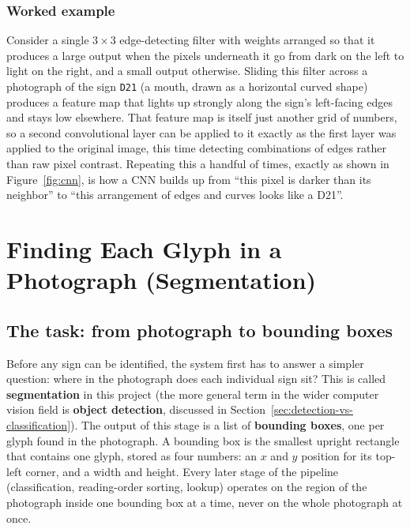 \documentclass[11pt,a4paper]{report}
\begin{document}
\subsection*{Worked example}

Consider a single $3\times3$ edge-detecting filter with weights arranged so
that it produces a large output when the pixels underneath it go from dark
on the left to light on the right, and a small output otherwise. Sliding
this filter across a photograph of the sign \texttt{D21} (a mouth, drawn as
a horizontal curved shape) produces a feature map that lights up strongly
along the sign's left-facing edges and stays low elsewhere. That feature map
is itself just another grid of numbers, so a second convolutional layer can
be applied to it exactly as the first layer was applied to the original
image, this time detecting combinations of edges rather than raw pixel
contrast. Repeating this a handful of times, exactly as shown in
Figure~\ref{fig:cnn}, is how a CNN builds up from ``this pixel is darker
than its neighbor'' to ``this arrangement of edges and curves looks like a
D21''.

\chapter{Finding Each Glyph in a Photograph (Segmentation)}
\label{ch:segmentation}

\section{The task: from photograph to bounding boxes}

Before any sign can be identified, the system first has to answer a simpler
question: where in the photograph does each individual sign sit? This is
called \textbf{segmentation} in this project (the more general term in the
wider computer vision field is \textbf{object detection}, discussed in
Section~\ref{sec:detection-vs-classification}). The output of this stage is
a list of \textbf{bounding boxes}, one per glyph found in the photograph. A
bounding box is the smallest upright rectangle that contains one glyph,
stored as four numbers: an $x$ and $y$ position for its top-left corner, and
a width and height. Every later stage of the pipeline (classification,
reading-order sorting, lookup) operates on the region of the photograph
inside one bounding box at a time, never on the whole photograph at once.
\end{document}
